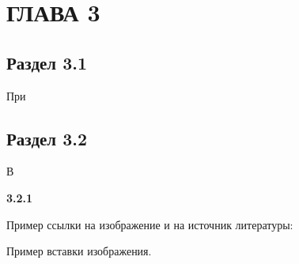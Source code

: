 \chapter[Глава 3]
{ГЛАВА 3}

\section{Раздел 3.1}\par
\hspace*{12.5 mm}При 

\section{Раздел 3.2}\par
\hspace*{12.5 mm}В 

\bf{3.2.1}  

Пример ссылки на изображение и на источник литературы:

Пример вставки изображения.
